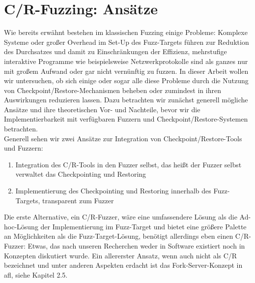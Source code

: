 \documentclass[a4paper]{article}
\begin{document}
\section{C/R-Fuzzing: Ansätze}
Wie bereits erwähnt bestehen im klassischen Fuzzing einige Probleme: Komplexe Systeme oder großer Overhead im Set-Up des Fuzz-Targets führen zur Reduktion des Durchsatzes und damit zu Einschränkungen der Effizienz, mehrstufige interaktive Programme wie beispielsweise Netzwerkprotokolle sind als ganzes nur mit großem Aufwand oder gar nicht vernünftig zu fuzzen. 
In dieser Arbeit wollen wir untersuchen, ob sich einige oder sogar alle diese Probleme durch die Nutzung von Checkpoint/Restore-Mechanismen beheben oder zumindest in ihren Auswirkungen reduzieren lassen. 
Dazu betrachten wir zunächst generell mögliche Ansätze und ihre theoretischen Vor- und Nachteile, bevor wir die Implementierbarkeit mit verfügbaren Fuzzern und Checkpoint/Restore-Systemen betrachten.\\
Generell sehen wir zwei Ansätze zur Integration von Checkpoint/Restore-Tools und Fuzzern:
\begin{enumerate}
    \item Integration des C/R-Tools in den Fuzzer selbst, das heißt der Fuzzer selbst verwaltet das Checkpointing und Restoring
    \item Implementierung des Checkpointing und Restoring innerhalb des Fuzz-Targets, transparent zum Fuzzer
\end{enumerate}
Die erste Alternative, ein C/R-Fuzzer, wäre eine umfassendere Lösung als die Ad-hoc-Lösung der Implementierung im Fuzz-Target und bietet eine größere Palette an Möglichkeiten als die Fuzz-Target-Lösung, benötigt allerdings eben einen C/R-Fuzzer: Etwas, das nach unseren Recherchen weder in Software existiert noch in Konzepten diskutiert wurde.
Ein allererster Ansatz, wenn auch nicht als C/R bezeichnet und unter anderen Aspekten erdacht ist das Fork-Server-Konzept in afl\cite{aflrestore}, siehe Kapitel 2.5. \\
\end{document}
